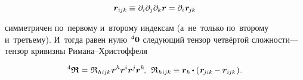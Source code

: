 \begin{otherlanguage}{russian}
\nopagebreak\vspace{-0.5em}
\begin{equation}
\bm{r}_{i\hspace{-0.1ex}jk} \hspace{-0.1ex} \equiv \hspace{.1ex} \partial_i \partial_j \partial_k \bm{r}
= \partial_i \hspace{.12ex} \bm{r}_{\hspace{-0.2ex}jk} %
\end{equation}

\vspace{-0.2em} \noindent симметричен по~первому и~второму индексам (а~не~только по~второму и~третьему). И~тогда равен нулю~${\hspace{-0.16ex}^4\bm{0}}$ следующий тензор четвёртой сложности\:--- тензор кривизны Римана\hbox{--}Христоффеля

\nopagebreak\vspace{-0.1em}\begin{equation}\label{riemanncurvaturetensor}
{^4\bm{\mathfrak{R}}} = \hspace{.12ex} \mathfrak{R}_{\hspace{.1ex}hi\hspace{-0.1ex}jk} \hspace{.12ex} \bm{r}^h \bm{r}^i \bm{r}^j \bm{r}^k \hspace{-0.25ex},
\:\:
\mathfrak{R}_{\hspace{.1ex}hi\hspace{-0.1ex}jk} \hspace{-0.12ex} \equiv
\bm{r}_h \hspace{-0.15ex} \dotp \left( \hspace{.12ex} \bm{r}_{\hspace{-0.2ex}jik} \hspace{-0.2ex} - \bm{r}_{i\hspace{-0.1ex}jk} \hspace{.12ex} \right)
\hspace{-0.3ex} .
\end{equation}


\end{otherlanguage}
